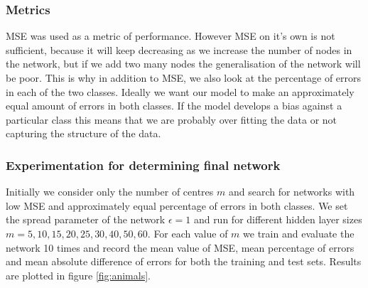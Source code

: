 \documentclass[a4paper, 11pt]{article}
\begin{document}
\subsubsection*{Metrics}
MSE was used as a metric of performance. However MSE on it's own is not sufficient, because it will keep decreasing as we increase the number of nodes in the network, but if we add two many nodes the generalisation of the network will be poor. This is why in addition to MSE, we also look at the percentage of errors in each of the two classes. Ideally we want our model to make an approximately equal amount of errors in both classes. If the model develops a bias against a particular class this means that we are probably over fitting the data or not capturing the structure of the data.



\subsubsection*{Experimentation for determining final network}
Initially we consider only the number of centres $m$ and search for networks with low MSE and approximately equal percentage of errors in both classes. We set the spread parameter of the network $\epsilon = 1$ and run for different hidden layer sizes $m = 5, 10, 15, 20, 25, 30, 40, 50, 60$. For each value of $m$ we train and evaluate the network 10 times and record the mean value of MSE, mean percentage of errors and mean absolute difference of errors for both the training and test sets. Results are plotted in figure \ref{fig:animals}.
\end{document}
